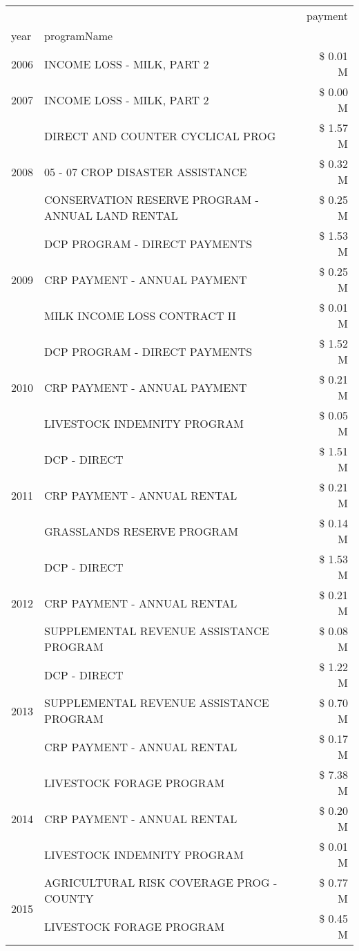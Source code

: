 \begin{tabular}{llr}
\toprule
 &  & payment \\
year & programName &  \\
\midrule
2006 & INCOME LOSS - MILK, PART 2 & \$ 0.01 M \\
\cline{1-3}
2007 & INCOME LOSS - MILK, PART 2 & \$ 0.00 M \\
\cline{1-3}
\multirow[t]{3}{*}{2008} & DIRECT AND COUNTER CYCLICAL PROG & \$ 1.57 M \\
 & 05 - 07 CROP DISASTER ASSISTANCE & \$ 0.32 M \\
 & CONSERVATION RESERVE PROGRAM - ANNUAL LAND RENTAL & \$ 0.25 M \\
\cline{1-3}
\multirow[t]{3}{*}{2009} & DCP PROGRAM - DIRECT PAYMENTS & \$ 1.53 M \\
 & CRP PAYMENT - ANNUAL PAYMENT & \$ 0.25 M \\
 & MILK INCOME LOSS CONTRACT II & \$ 0.01 M \\
\cline{1-3}
\multirow[t]{3}{*}{2010} & DCP PROGRAM - DIRECT PAYMENTS & \$ 1.52 M \\
 & CRP PAYMENT - ANNUAL PAYMENT & \$ 0.21 M \\
 & LIVESTOCK INDEMNITY PROGRAM & \$ 0.05 M \\
\cline{1-3}
\multirow[t]{3}{*}{2011} & DCP - DIRECT & \$ 1.51 M \\
 & CRP PAYMENT - ANNUAL RENTAL & \$ 0.21 M \\
 & GRASSLANDS RESERVE PROGRAM & \$ 0.14 M \\
\cline{1-3}
\multirow[t]{3}{*}{2012} & DCP - DIRECT & \$ 1.53 M \\
 & CRP PAYMENT - ANNUAL RENTAL & \$ 0.21 M \\
 & SUPPLEMENTAL REVENUE ASSISTANCE PROGRAM & \$ 0.08 M \\
\cline{1-3}
\multirow[t]{3}{*}{2013} & DCP - DIRECT & \$ 1.22 M \\
 & SUPPLEMENTAL REVENUE ASSISTANCE PROGRAM & \$ 0.70 M \\
 & CRP PAYMENT - ANNUAL RENTAL & \$ 0.17 M \\
\cline{1-3}
\multirow[t]{3}{*}{2014} & LIVESTOCK FORAGE PROGRAM & \$ 7.38 M \\
 & CRP PAYMENT - ANNUAL RENTAL & \$ 0.20 M \\
 & LIVESTOCK INDEMNITY PROGRAM & \$ 0.01 M \\
\cline{1-3}
\multirow[t]{3}{*}{2015} & AGRICULTURAL RISK COVERAGE PROG - COUNTY & \$ 0.77 M \\
 & LIVESTOCK FORAGE PROGRAM & \$ 0.45 M \\

\end{tabular}
